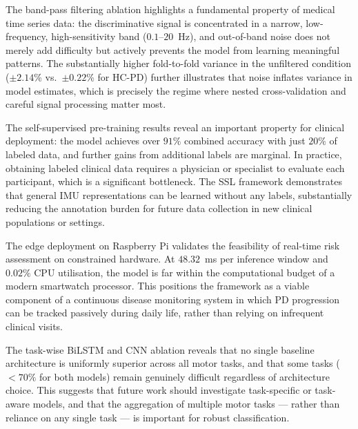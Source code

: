 \documentclass[conference]{IEEEtran}
\begin{document}
The band-pass filtering ablation highlights a fundamental property of medical time series data: the discriminative signal is concentrated in a narrow, low-frequency, high-sensitivity band ($0.1$--$20$~Hz), and out-of-band noise does not merely add difficulty but actively prevents the model from learning meaningful patterns. The substantially higher fold-to-fold variance in the unfiltered condition ($\pm2.14$\% vs.\ $\pm0.22$\% for HC-PD) further illustrates that noise inflates variance in model estimates, which is precisely the regime where nested cross-validation and careful signal processing matter most.

The self-supervised pre-training results reveal an important property for clinical deployment: the model achieves over $91\%$ combined accuracy with just $20\%$ of labeled data, and further gains from additional labels are marginal. In practice, obtaining labeled clinical data requires a physician or specialist to evaluate each participant, which is a significant bottleneck. The SSL framework demonstrates that general IMU representations can be learned without any labels, substantially reducing the annotation burden for future data collection in new clinical populations or settings.

The edge deployment on Raspberry Pi validates the feasibility of real-time risk assessment on constrained hardware. At $48.32$~ms per inference window and $0.02\%$ CPU utilisation, the model is far within the computational budget of a modern smartwatch processor. This positions the framework as a viable component of a continuous disease monitoring system in which PD progression can be tracked passively during daily life, rather than relying on infrequent clinical visits.

The task-wise BiLSTM and CNN ablation reveals that no single baseline architecture is uniformly superior across all motor tasks, and that some tasks ($<70\%$ for both models) remain genuinely difficult regardless of architecture choice. This suggests that future work should investigate task-specific or task-aware models, and that the aggregation of multiple motor tasks --- rather than reliance on any single task --- is important for robust classification.

\end{document}
